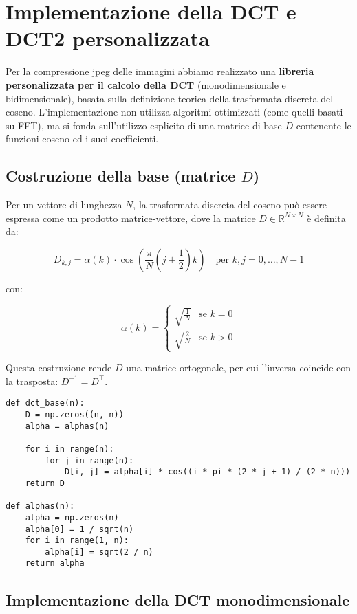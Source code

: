 \section{Implementazione della DCT e DCT2 personalizzata}

Per la compressione jpeg delle immagini abbiamo realizzato una \textbf{libreria personalizzata per il calcolo della DCT} (monodimensionale e bidimensionale), basata sulla definizione teorica della trasformata discreta del coseno. L'implementazione non utilizza algoritmi ottimizzati (come quelli basati su FFT), ma si fonda sull'utilizzo esplicito di una matrice di base $D$ contenente le funzioni coseno ed i suoi coefficienti.

\subsection{Costruzione della base (matrice $D$)}

Per un vettore di lunghezza $N$, la trasformata discreta del coseno può essere espressa come un prodotto matrice-vettore, dove la matrice $D \in \mathbb{R}^{N \times N}$ è definita da:

\[
D_{k,j} = \alpha(k) \cdot \cos\left( \frac{\pi}{N} \left(j + \frac{1}{2} \right) k \right) \quad \text{per } k,j = 0, \dots, N-1
\]

con:

\[
\alpha(k) = 
\begin{cases}
\sqrt{\frac{1}{N}} & \text{se } k = 0 \\
\sqrt{\frac{2}{N}} & \text{se } k > 0
\end{cases}
\]

Questa costruzione rende $D$ una matrice ortogonale, per cui l'inversa coincide con la trasposta: $D^{-1} = D^\top$.
\begin{footnotesize}
\begin{verbatim}
def dct_base(n):
    D = np.zeros((n, n))
    alpha = alphas(n)

    for i in range(n):
        for j in range(n):
            D[i, j] = alpha[i] * cos((i * pi * (2 * j + 1) / (2 * n)))
    return D

def alphas(n):
    alpha = np.zeros(n)
    alpha[0] = 1 / sqrt(n)
    for i in range(1, n):
        alpha[i] = sqrt(2 / n)
    return alpha
\end{verbatim}
\end{footnotesize}

\subsection{Implementazione della DCT monodimensionale}

